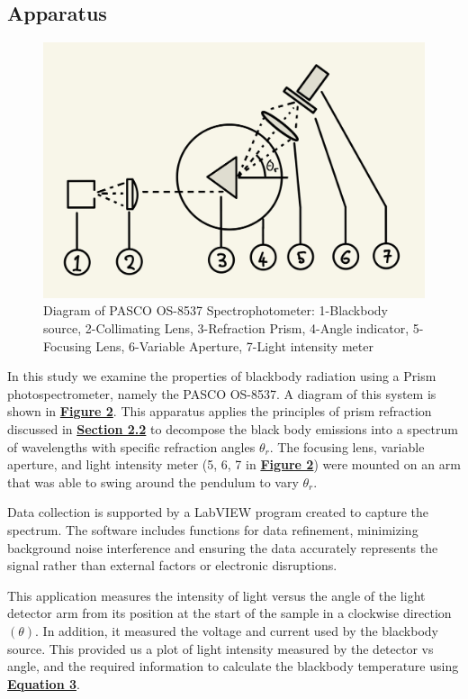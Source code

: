 \documentclass[
	letterpaper
	12pt
]{template}
\newcommand{\bref}[2]{\textbf{\hyperref[#1]{#2}}}
\begin{document}
\subsection{Apparatus}
\begin{figure}\label{fig::apparatus}
	\vspace{-15pt}
	\includegraphics[width=.4\textwidth]{img/apparatus.jpeg}
	\caption{Diagram of PASCO OS-8537 Spectrophotometer: 1-Blackbody source, 2-Collimating Lens, 3-Refraction Prism, 4-Angle indicator, 5-Focusing Lens, 6-Variable Aperture, 7-Light intensity meter}
	\vspace{-20pt}
\end{figure}
In this study we examine the properties of blackbody radiation using a Prism photospectrometer, namely the PASCO OS-8537. A diagram of this system is shown in  \bref{fig::apparatus}{Figure 2}. This apparatus applies the principles of prism refraction discussed in \bref{sec::refraction}{Section 2.2} to decompose the black body emissions into a spectrum of wavelengths with specific refraction angles $\theta_r$. The focusing lens, variable aperture, and light intensity meter (5, 6, 7 in \bref{fig::apparatus}{Figure 2}) were mounted on an arm that was able to swing around the pendulum to vary $\theta_r$. \vspace{\baselineskip}

Data collection is supported by a LabVIEW program created to capture the spectrum. The software includes functions for data refinement, minimizing background noise interference and ensuring the data accurately represents the signal rather than external factors or electronic disruptions.\vspace{\baselineskip}

This application measures the intensity of light versus the angle of the light detector arm from its position at the start of the sample in a clockwise direction $(\theta)$. In addition, it measured the voltage and current used by the blackbody source. This provided us a plot of light intensity measured by the detector vs angle, and the required information to calculate the blackbody temperature using \bref{eqn::temp}{Equation 3}.
\end{document}
